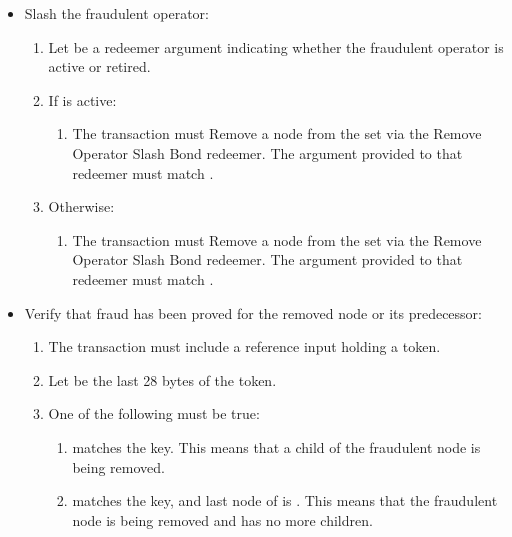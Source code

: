 \documentclass[../midgard.tex]{subfiles}
\begin{document}
\begin{description}
\begin{itemize}
        \item Slash the fraudulent operator:
        \begin{enumerate}[resume]
            \item Let  be a redeemer argument indicating whether the fraudulent operator is active or retired.
            \item If  is active:
                \begin{enumerate}
                    \item The transaction must Remove a node from the  set via the Remove Operator Slash Bond redeemer. The  argument provided to that redeemer must match .
                \end{enumerate}
            \item Otherwise:
                \begin{enumerate}
                    \item The transaction must Remove a node from the  set via the Remove Operator Slash Bond redeemer. The  argument provided to that redeemer must match .
                \end{enumerate}
        \end{enumerate}

        \item Verify that fraud has been proved for the removed node or its predecessor:
        \begin{enumerate}[resume]
            \item The transaction must include a reference input holding a  token.
            \item Let  be the last 28 bytes of the  token.
            \item One of the following must be true:
                \begin{enumerate}
                    \item {} matches the  key. This means that a child of the fraudulent node is being removed.
                    \item {} matches the  key, and last node of  is . This means that the fraudulent node is being removed and has no more children.
                \end{enumerate}
        \end{enumerate}
    \end{itemize}
\end{description}
\end{document}
